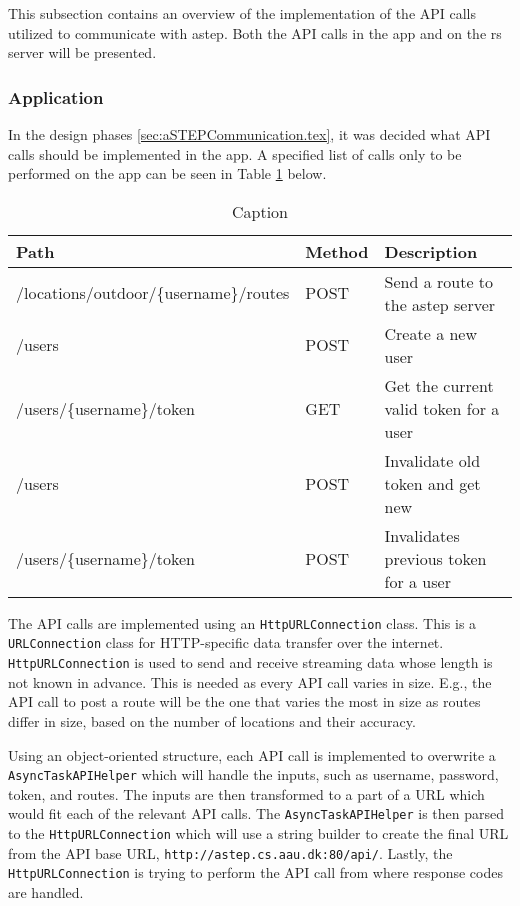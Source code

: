 This subsection contains an overview of the implementation of the API calls utilized to communicate with \gls{astep}.
Both the API calls in the app and on the \gls{rs} server will be presented.

 \subsubsection{Application}
In the design phases \ref{sec:aSTEPCommunication.tex}, it was decided what API calls should be implemented in the app.
A specified list of calls only to be performed on the app can be seen in Table \ref{tab:asteprequests} below.

\begin{table}[h]
	\centering
	\scriptsize
	\begin{tabular}{l l l}
		Path & Method & Description\\\midrule
		/locations/outdoor/\{username\}/routes & POST & Send a route to the \gls{astep} server\\
		/users & POST & Create a new user\\
		/users/\{username\}/token & GET & Get the current valid token for a user\\
		/users & POST & Invalidate old token and get new\\
		/users/\{username\}/token & POST & Invalidates previous token for a user\\
	\end{tabular}
	\caption{Caption}
	\label{tab:asteprequests}
\end{table} 

The API calls are implemented using an \texttt{HttpURLConnection} class.
This is a \texttt{URLConnection} class for HTTP-specific data transfer over the internet.
\texttt{HttpURLConnection} is used to send and receive streaming data whose length is not known in advance.
This is needed as every API call varies in size.
E.g., the API call to post a route will be the one that varies the most in size as routes differ in size, based on the number of locations and their accuracy.


Using an object-oriented structure, each API call is implemented to overwrite a \texttt{AsyncTaskAPIHelper} which will handle the inputs, such as username, password, token, and routes.
The inputs are then transformed to a part of a URL which would fit each of the relevant API calls.
The \texttt{AsyncTaskAPIHelper} is then parsed to the \texttt{HttpURLConnection} which will use a string builder to create the final URL from the API base URL, \texttt{http://astep.cs.aau.dk:80/api/}.
Lastly, the \texttt{HttpURLConnection} is trying to perform the API call from where response codes are handled.

